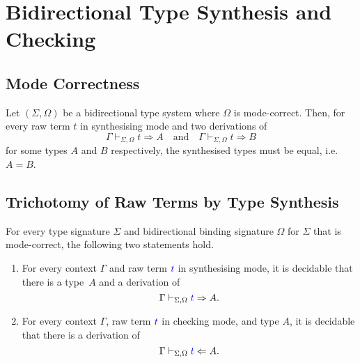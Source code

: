 
\section{Bidirectional Type Synthesis and Checking} \label{sec:type-synthesis}

\subsection{Mode Correctness}

\begin{theorem}\label{thm:unique-syn}
  Let $(\Sigma, \Omega)$ be a bidirectional type system where $\Omega$ is mode-correct.
  Then, for every raw term $t$ in synthesising mode and two derivations of 
  \[
    \Gamma \vdash_{\Sigma, \Omega} t \Rightarrow A
    \quad\text{and}\quad
    \Gamma \vdash_{\Sigma, \Omega} t \Rightarrow B
  \]
  for some types $A$ and $B$ respectively, the synthesised types must be equal, i.e.\ $A = B$.
\end{theorem}
 

\subsection{Trichotomy of Raw Terms by Type Synthesis}

\begin{theorem} \label{thm:bidirectional-type-synthesis}
  For every type signature $\Sigma$ and bidirectional binding signature $\Omega$ for $\Sigma$ that is mode-correct, the following two statements hold.

  \begin{enumerate}
    \item For every context $\Gamma$ and raw term ${\textcolor{blue}{t}}$ in synthesising mode, it is decidable that there is a type~$A$ and a derivation of
      \[
        \Gamma \vdash_{\Sigma, \Omega} {\textcolor{blue}{t}} \Rightarrow A.
      \]
    \item For every context $\Gamma$, raw term ${\textcolor{blue}{t}}$ in checking mode, and type $A$, it is decidable that there is a derivation of
      \[
        \Gamma \vdash_{\Sigma, \Omega} {\textcolor{blue}{t}} \Leftarrow A.
      \]
  \end{enumerate}
\end{theorem}

